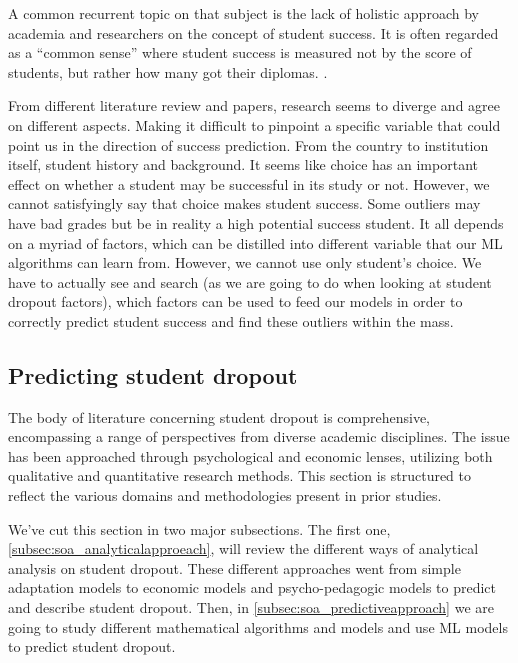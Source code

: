 \documentclass[conference]{IEEEtran}
\begin{document}
A common recurrent topic on that subject is the lack of holistic approach by academia and researchers on the concept of student success. It is often regarded as a “common sense” where student success is measured not by the score of students, but rather how many got their diplomas. \cite{weatherton_success_2021}.

From different literature review and papers, research seems to diverge and agree on different aspects. Making it difficult to pinpoint a specific variable that could point us in the direction of success prediction. From the country to institution itself, student history and background. It seems like choice has an important effect on whether a student may be successful in its study or not. However, we cannot satisfyingly say that choice makes student success.  Some outliers may have bad grades but be in reality a high potential success student. It all depends on a myriad of factors, which can be distilled into different variable that our ML algorithms can learn from. However, we cannot use only student's choice. We have to actually see and search (as we are going to do when looking at student dropout factors), which factors can be used to feed our models in order to correctly predict student success and find these outliers within the mass.\cite{kuh_what_2006, sa_how_2018}

\subsection{Predicting student dropout}
The body of literature concerning student dropout is comprehensive, encompassing a range of perspectives from diverse academic disciplines. The issue has been approached through psychological and economic lenses, utilizing both qualitative and quantitative research methods. This section is structured to reflect the various domains and methodologies present in prior studies.

We've cut this section in two major subsections. The first one, \ref{subsec:soa_analyticalapproeach}, will review the different ways of analytical analysis on student dropout. These different approaches went from simple adaptation models to economic models and psycho-pedagogic models to predict and describe student dropout. Then, in \ref{subsec:soa_predictiveapproach} we are going to study different mathematical algorithms and models and use ML models to predict student dropout.
\end{document}
